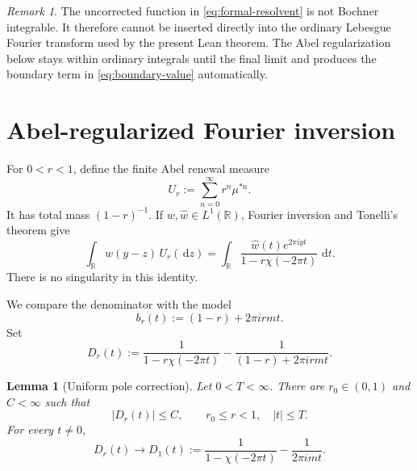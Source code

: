 \documentclass[10pt,reqno,a4paper]{amsart}
\numberwithin{equation}{section}
\theoremstyle{plain}
\newtheorem{lemma}[theorem]{Lemma}
\theoremstyle{definition}
\theoremstyle{remark}
\newtheorem{remark}[theorem]{Remark}
\newcommand{\R}{\mathbb{R}}
\newcommand{\1}{\mathbf{1}}
\newcommand{\de}{\,\mathrm{d}}
\newcommand{\abs}[1]{\left|#1\right|}
\begin{document}
\begin{remark}\label{rem:bochner-integral}
  The uncorrected function in \cref{eq:formal-resolvent} is not Bochner
  integrable.  It therefore cannot be inserted directly into the ordinary
  Lebesgue Fourier transform used by the present Lean theorem.  The
  Abel regularization below stays within ordinary integrals until the final
  limit and produces the boundary term in \cref{eq:boundary-value}
  automatically.
\end{remark}

\section{Abel-regularized Fourier inversion}\label{sec:abel}

For \(0<r<1\), define the finite Abel renewal measure
\begin{equation}\label{eq:abel-renewal}
  U_r:=\sum_{n=0}^{\infty}r^n\mu^{*n}.
\end{equation}
It has total mass \((1-r)^{-1}\).  If \(w,\widehat w\in L^1(\R)\), Fourier
inversion and Tonelli's theorem give
\begin{equation}\label{eq:abel-parseval}
  \int_\R w(y-z)\,U_r(\de z)
  =
  \int_\R
  \frac{\widehat w(t)e^{2\pi iyt}}
       {1-r\chi(-2\pi t)}
  \,\de t.
\end{equation}
There is no singularity in this identity.

We compare the denominator with the model
\begin{equation}\label{eq:model-denominator}
  b_r(t):=(1-r)+2\pi i rmt.
\end{equation}
Set
\begin{equation}\label{eq:corrected-resolvent}
  D_r(t)
  :=
  \frac{1}{1-r\chi(-2\pi t)}
  -
  \frac{1}{(1-r)+2\pi i rmt}.
\end{equation}

\begin{lemma}[Uniform pole correction]\label{lem:uniform-pole-correction}
  Let \(0<T<\infty\).  There are \(r_0\in(0,1)\) and \(C<\infty\) such that
  \begin{equation}\label{eq:uniform-correction-bound}
    \abs{D_r(t)}\leq C,
    \qquad
    r_0\leq r<1,\quad \abs t\leq T.
  \end{equation}
  For every \(t\neq0\),
  \begin{equation}\label{eq:correction-pointwise-limit}
    D_r(t)\longrightarrow
    D_1(t)
    :=
    \frac{1}{1-\chi(-2\pi t)}
    -
    \frac{1}{2\pi i mt}.
  \end{equation}
\end{lemma}
\end{document}

